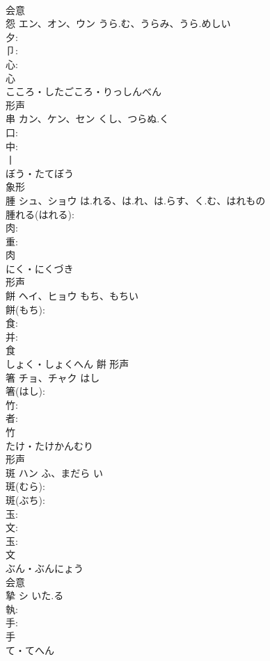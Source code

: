 \documentclass[8pt]{extreport}
\begin{document}
\begin{CJK}{UTF8}{min}
\\	会意 
\\	怨	エン、オン、ウン	うら.む、うらみ、うら.めしい		
\\	夕: 
\\	卩: 
\\	心: 
\\	心	
\\	こころ・したごころ・りっしんべん	
\\	形声 
\\	串	カン、ケン、セン	くし、つらぬ.く		
\\	口: 
\\	中: 
\\	丨	
\\	ぼう・たてぼう	
\\	象形 
\\	腫	シュ、ショウ	は.れる、は.れ、は.らす、く.む、はれもの		
\\	腫れる(はれる): 
\\	肉: 
\\	重: 
\\	肉	
\\	にく・にくづき	
\\	形声 
\\	餅	ヘイ、ヒョウ	もち、もちい		
\\	餅(もち): 
\\	食: 
\\	并: 
\\	食	
\\	しょく・しょくへん	餠	形声 
\\	箸	チョ、チャク	はし		
\\	箸(はし): 
\\	竹: 
\\	者: 
\\	竹	
\\	たけ・たけかんむり	
\\	形声 
\\	斑	ハン	ふ、まだら	い	
\\	斑(むら): 
\\	斑(ぶち): 
\\	玉: 
\\	文: 
\\	玉: 
\\	文	
\\	ぶん・ぶんにょう	
\\	会意 
\\	摯	シ	いた.る		
\\	執: 
\\	手: 
\\	手	
\\	て・てへん	

\end{CJK}
\end{document}
